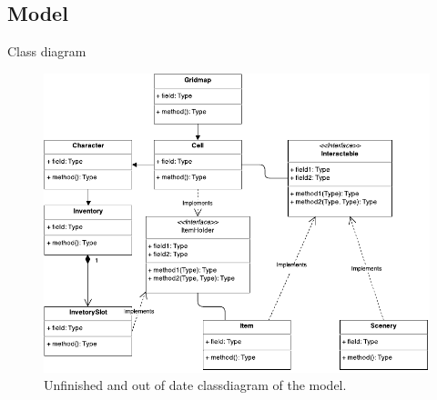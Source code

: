 \subsection{Model}
Class diagram

\begin{figure}[htbp]
	\centering
	\includegraphics[width=\textwidth]{model-classdiagram.pdf}
	\caption{Unfinished and out of date classdiagram of the model.}
\end{figure}
